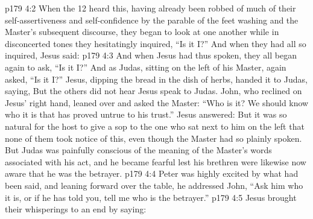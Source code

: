 \vs p179 4:2 When the 12 heard this, having already been robbed of much of their self\hyp{}assertiveness and self\hyp{}confidence by the parable of the feet washing and the Master’s subsequent discourse, they began to look at one another while in disconcerted tones they hesitatingly inquired, “Is it I?” And when they had all so inquired, Jesus said: 
\vs p179 4:3 And when Jesus had thus spoken, they all began again to ask, “Is it I?” And as Judas, sitting on the left of his Master, again asked, “Is it I?” Jesus, dipping the bread in the dish of herbs, handed it to Judas, saying,  But the others did not hear Jesus speak to Judas. John, who reclined on Jesus’ right hand, leaned over and asked the Master: “Who is it? We should know who it is that has proved untrue to his trust.” Jesus answered:  But it was so natural for the host to give a sop to the one who sat next to him on the left that none of them took notice of this, even though the Master had so plainly spoken. But Judas was painfully conscious of the meaning of the Master’s words associated with his act, and he became fearful lest his brethren were likewise now aware that he was the betrayer.
\vs p179 4:4 Peter was highly excited by what had been said, and leaning forward over the table, he addressed John, “Ask him who it is, or if he has told you, tell me who is the betrayer.”
\vs p179 4:5 Jesus brought their whisperings to an end by saying: 
